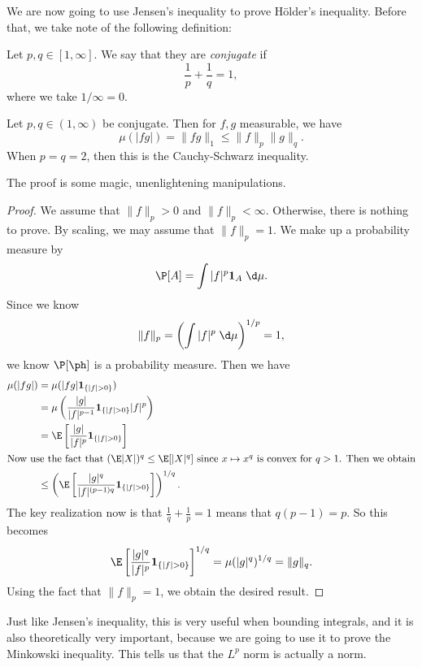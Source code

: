 \documentclass[a4paper]{article}
\begin{document}
We are now going to use Jensen's inequality to prove H\"older's inequality. Before that, we take note of the following definition:
\begin{defi}[Conjugate]
  Let $p, q \in [1, \infty]$. We say that they are \emph{conjugate} if
  \[
    \frac{1}{p} + \frac{1}{q} = 1,
  \]
  where we take $1/\infty = 0$.
\end{defi}

\begin{prop}
  Let $p, q \in (1, \infty)$ be conjugate. Then for $f, g$ measurable, we have
  \[
    \mu(|fg|) = \|fg\|_1 \leq \|f\|_p \|g\|_q.
  \]
  When $p = q = 2$, then this is the Cauchy-Schwarz inequality.
\end{prop}

The proof is some magic, unenlightening manipulations.
\begin{proof}
  We assume that $\|f\|_p > 0$ and $\|f\|_p < \infty$. Otherwise, there is nothing to prove. By scaling, we may assume that $\|f\|_p = 1$. We make up a probability measure by
  \[
    \P[A] = \int |f|^p \mathbf{1}_A \;\d \mu.
  \]
  Since we know
  \[
    \|f\|_p = \left(\int |f|^p\;\d \mu\right)^{1/p} = 1,
  \]
  we know $\P[\ph]$ is a probability measure. Then we have
  \begin{align*}
    \mu(|fg|) &= \mu(|fg| \mathbf{1}_{\{|f| > 0\}})\\
    &= \mu\left(\frac{|g|}{|f|^{p - 1}} \mathbf{1}_{\{|f| > 0\}} |f|^p\right)\\
    &= \E\left[\frac{|g|}{|f|^p}\mathbf{1}_{\{|f| > 0\}}\right]\\
    \intertext{Now use the fact that $(\E|X|)^q \leq \E[|X|^q]$ since $x \mapsto x^q$ is convex for $q > 1$. Then we obtain}
    &\leq \left(\E\left[\frac{|g|^q}{|f|^{(p - 1)q}}\mathbf{1}_{\{|f| > 0\}}\right]\right)^{1/q}.
  \end{align*}
  The key realization now is that $\frac{1}{q} + \frac{1}{p} = 1$ means that $q(p - 1) = p$. So this becomes
  \[
    \E\left[\frac{|g|^q}{|f|^p} \mathbf{1}_{\{|f| > 0\}}\right]^{1/q} = \mu(|g|^q)^{1/q} = \|g\|_q.
  \]
  Using the fact that $\|f\|_p = 1$, we obtain the desired result.
\end{proof}

Just like Jensen's inequality, this is very useful when bounding integrals, and it is also theoretically very important, because we are going to use it to prove the Minkowski inequality. This tells us that the $L^p$ norm is actually a norm.
\end{document}

